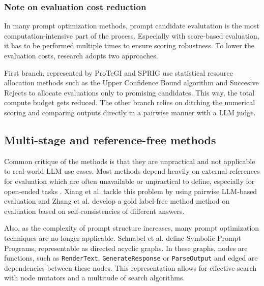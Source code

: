 \subsubsection{Note on evaluation cost reduction} 
In many prompt optimization methods, prompt candidate evalutation is the most computation-intensive part of the process.
Especially with score-based evaluation, it has to be performed multiple times to ensure scoring robustness\cite{xiang2025selfsupervisedpromptoptimization}.
To lower the evaluation costs, research adopts two approaches. 

First branch, represented by ProTeGI\cite{pryzant2023automaticpromptoptimizationgradient} and SPRIG\cite{zhang2024sprigimprovinglargelanguage} use statistical resource allocation methods such as the
Upper Confidence Bound algorithm and Succesive Rejects to allocate evaluations only to promising candidates. This way, the total compute budget gets reduced.
The other branch relies on ditching the numerical scoring and comparing outputs directly in a pairwise manner with a LLM judge\cite{xiang2025selfsupervisedpromptoptimization}.

\subsection{Multi-stage and reference-free methods}

Common critique of the methods is that they are unpractical and not applicable to real-world LLM use cases.
Most methods depend heavily on external references for evaluation which are often unavailable or 
unpractical to define, especially for open-ended tasks \cite{xiang2025selfsupervisedpromptoptimization}.
Xiang et al.\cite{xiang2025selfsupervisedpromptoptimization} tackle this problem by using pairwise LLM-based evaluation
and Zhang et al.\cite{zhang2024glapegoldlabelagnosticprompt} develop a gold label-free method method on evaluation based
on self-consistencies of different answers.

Also, as the complexity of prompt structure increases, many prompt optimization techniques are no longer applicable\cite{schnabel2024symbolicpromptprogramsearch}.
Schnabel et al.\cite{schnabel2024symbolicpromptprogramsearch} define Symbolic Prompt Programs, representable
as directed acyclic graphs. In these graphs, nodes are functions, such as \texttt{RenderText}, \texttt{GenerateResponse} or \texttt{ParseOutput} 
and edged are dependencies between these nodes. This representation allows for effective search with node mutators
and a multitude of search algorithms.

